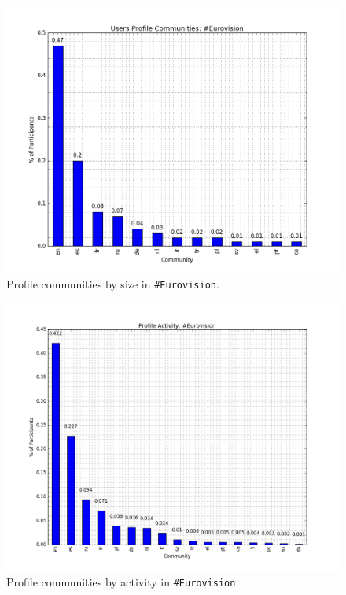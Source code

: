\documentclass{llncs}
\begin{document}
\begin{figure}[htb]
\centering
\includegraphics[width=\columnwidth]{images/eurovision_profile_size.png}
\caption{Profile communities by size in {\texttt{\#Eurovision}}.}
\label{fig:eurovisionprofilesize}
\end{figure}

\begin{figure}[htb]
\centering
\includegraphics[width=\columnwidth]{images/eurovision_profile_activity.png}
\caption{Profile communities by activity in {\texttt{\#Eurovision}}.}
\label{fig:eurovisionprofileactivity}
\end{figure}
\end{document}
